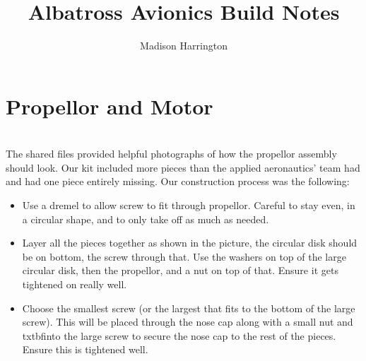 \documentclass{article}
\begin{document}
\title{Albatross Avionics Build Notes}
\author{Madison Harrington}
\maketitle

\section{Propellor and Motor} \\

The shared files provided helpful photographs of how the propellor assembly should look. Our kit included more pieces than the applied aeronautics' team had and had one piece entirely missing. Our construction process was the following: 

\begin{itemize}

\item Use a dremel to allow screw to fit through propellor. Careful to stay even, in a circular shape, and to only take off as much as needed. 
\item Layer all the pieces together as shown in the picture, the circular disk should be on bottom, the screw through that. Use the washers
on top of the large circular disk, then the propellor, and a nut on top of that. Ensure it gets tightened on really well. 
\item Choose the smallest screw (or the largest that fits to the bottom of the large screw). This will be placed through the nose cap 
along with a small nut and txtbf{into the large screw} to secure the nose cap to the rest of the pieces. Ensure this is tightened well.

\end{itemize}
\end{document}
